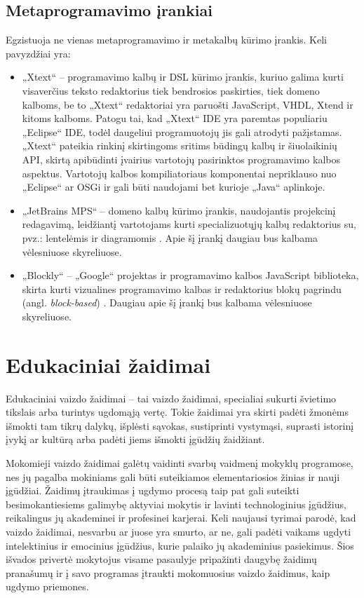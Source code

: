 \documentclass{VUMIFPSkursinis}
\begin{document}
\subsection{Metaprogramavimo įrankiai}
Egzistuoja ne vienas metaprogramavimo ir metakalbų kūrimo įrankis. Keli pavyzdžiai yra:
\begin{itemize}
    \item „Xtext“ -- programavimo kalbų ir DSL kūrimo įrankis, kuriuo galima kurti visaverčius teksto redaktorius tiek bendrosios paskirties, tiek domeno kalboms, be to „Xtext“ redaktoriai yra paruošti JavaScript, VHDL, Xtend ir kitoms kalboms. Patogu tai, kad „Xtext“ IDE yra paremtas populiariu „Eclipse“ IDE, todėl daugeliui programuotojų jis gali atrodyti pažįstamas. „Xtext“ pateikia rinkinį skirtingoms sritims būdingų kalbų ir šiuolaikinių API, skirtą apibūdinti įvairius vartotojų pasirinktos programavimo kalbos aspektus. Vartotojų kalbos kompiliatoriaus komponentai nepriklauso nuo „Eclipse“ ar OSGi ir gali būti naudojami bet kurioje „Java“ aplinkoje. \cite{eysholdt2010xtext}
    \item „JetBrains MPS“ -- domeno kalbų kūrimo įrankis, naudojantis projekcinį redagavimą, leidžiantį vartotojams kurti specializuotųjų kalbų redaktorius su, pvz.: lentelėmis ir diagramomis \cite{JetBrainsMPS}. Apie šį įrankį daugiau bus kalbama vėlesniuose skyreliuose.
    \item „Blockly“ -- „Google“ projektas ir programavimo kalbos JavaScript biblioteka, skirta kurti vizualines programavimo kalbas ir redaktorius blokų pagrindu (angl. \textit{block-based}) \cite{NBCBayArea}. Daugiau apie šį įrankį bus kalbama vėlesniuose skyreliuose.
\end{itemize}

\section{Edukaciniai žaidimai}

Edukaciniai vaizdo žaidimai -- tai vaizdo žaidimai, specialiai sukurti švietimo tikslais arba turintys ugdomąją vertę. Tokie žaidimai yra skirti padėti žmonėms išmokti tam tikrų dalykų, išplėsti sąvokas, sustiprinti vystymąsi, suprasti istorinį įvykį ar kultūrą arba padėti jiems išmokti įgūdžių žaidžiant.

Mokomieji vaizdo žaidimai galėtų vaidinti svarbų vaidmenį mokyklų programose, nes jų pagalba mokiniams gali būti suteikiamos elementariosios žinias ir nauji įgūdžiai. Žaidimų įtraukimas į ugdymo procesą taip pat gali suteikti besimokantiesiems galimybę aktyviai mokytis ir lavinti technologinius įgūdžius, reikalingus jų akademinei ir profesinei karjerai. Keli naujausi tyrimai parodė, kad vaizdo žaidimai, nesvarbu ar juose yra smurto, ar ne, gali padėti vaikams ugdyti intelektinius ir emocinius įgūdžius, kurie palaiko jų akademinius pasiekimus. Šios išvados privertė mokytojus visame pasaulyje pripažinti daugybę žaidimų pranašumų ir į savo programas įtraukti mokomuosius vaizdo žaidimus, kaip ugdymo priemones. \cite{chang2009learning}
\end{document}
